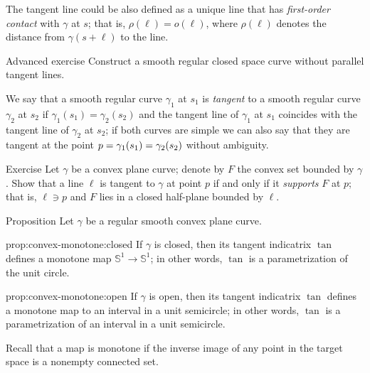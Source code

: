 The tangent line could be also defined as a unique line that has \emph{first-order contact} with $\gamma$ at $s$;
that is, $\rho(\ell)=o(\ell)$, where $\rho(\ell)$ denotes the distance from $\gamma(s+\ell)$ to the line.

\begin{thm}{Advanced exercise}\label{ex:no-parallel-tangents}
Construct a smooth regular closed space curve without parallel tangent lines.
\end{thm}

We say that a smooth regular curve $\gamma_1$ at $s_1$ is \emph{tangent} to a smooth regular curve $\gamma_2$ at $s_2$
if $\gamma_1(s_1)=\gamma_2(s_2)$ and the tangent line of $\gamma_1$ at $s_1$ coincides with the tangent line of $\gamma_2$ at $s_2$;
if both curves are simple we can also say that they are tangent at the point $p=\gamma_1(s_1)\z=\gamma_2(s_2)$ without ambiguity.

\begin{thm}{Exercise}\label{ex:tangent-support}
Let $\gamma$ be a convex plane curve;
denote by $F$ the convex set bounded by $\gamma$.
Show that a line $\ell$ is tangent to $\gamma$ at point $p$ if and only if it \emph{supports} $F$ at $p$;
that is, $\ell\ni p$ and $F$ lies in a closed half-plane bounded by $\ell$.
\end{thm}

\begin{thm}{Proposition}\label{prop:convex-monotone}
Let $\gamma$ be a regular smooth convex plane curve.

\begin{subthm}{prop:convex-monotone:closed}
If $\gamma$ is closed, then its tangent indicatrix $\tan$ defines a monotone map $\mathbb{S}^1\to \mathbb{S}^1$;
in other words, $\tan$ is a parametrization of the unit circle.
\end{subthm}

\begin{subthm}{prop:convex-monotone:open}
If $\gamma$ is open, then its tangent indicatrix $\tan$ defines a monotone map to an interval in a unit semicircle;
in other words, $\tan$ is a parametrization of an interval in a unit semicircle.
\end{subthm}

\end{thm}

Recall that a map is monotone if the inverse image of any point in the target space is a nonempty connected set.

